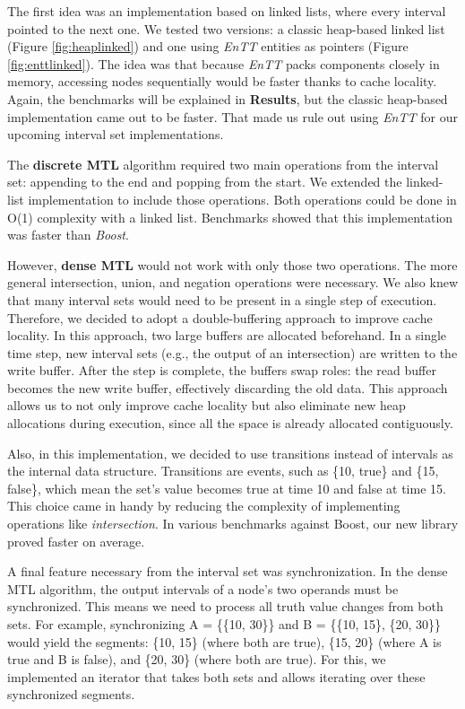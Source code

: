 \documentclass[a4paper,12pt]{report}
\begin{document}
The first idea was an implementation based on linked lists, where every interval pointed to the next one. We tested two versions: a classic heap-based linked list (Figure \ref{fig:heaplinked}) and one using \textit{EnTT} entities as pointers (Figure \ref{fig:enttlinked}). The idea was that because \textit{EnTT} packs components closely in memory, accessing nodes sequentially would be faster thanks to cache locality. Again, the benchmarks will be explained in \textbf{Results}, but the classic heap-based implementation came out to be faster. That made us rule out using \textit{EnTT} for our upcoming interval set implementations.

The \textbf{discrete MTL} algorithm required two main operations from the interval set: appending to the end and popping from the start. We extended the linked-list implementation to include those operations. Both operations could be done in O(1) complexity with a linked list. Benchmarks showed that this implementation was faster than \textit{Boost}.

However, \textbf{dense MTL} would not work with only those two operations. The more general intersection, union, and negation operations were necessary. We also knew that many interval sets would need to be present in a single step of execution. Therefore, we decided to adopt a double-buffering approach to improve cache locality. In this approach, two large buffers are allocated beforehand. In a single time step, new interval sets (e.g., the output of an intersection) are written to the write buffer. After the step is complete, the buffers swap roles: the read buffer becomes the new write buffer, effectively discarding the old data. This approach allows us to not only improve cache locality but also eliminate new heap allocations during execution, since all the space is already allocated contiguously.

Also, in this implementation, we decided to use transitions instead of intervals as the internal data structure. Transitions are events, such as \{10, true\} and \{15, false\}, which mean the set's value becomes true at time 10 and false at time 15. This choice came in handy by reducing the complexity of implementing operations like \textit{intersection}. In various benchmarks against Boost, our new library proved faster on average.

A final feature necessary from the interval set was synchronization. In the dense MTL algorithm, the output intervals of a node's two operands must be synchronized. This means we need to process all truth value changes from both sets. For example, synchronizing A = \{\{10, 30\}\} and B = \{\{10, 15\}, \{20, 30\}\} would yield the segments: \{10, 15\} (where both are true), \{15, 20\} (where A is true and B is false), and \{20, 30\} (where both are true). For this, we implemented an iterator that takes both sets and allows iterating over these synchronized segments.
\end{document}
